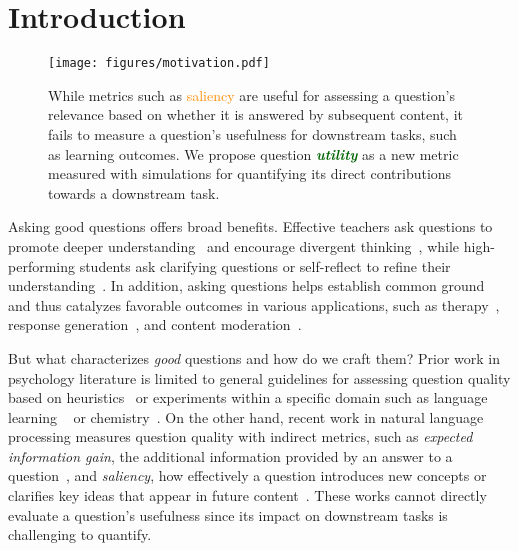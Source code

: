 \section{Introduction}


\begin{figure}[t!]
    \centering
    \begin{minipage}{\columnwidth}
    \centering
    \texttt{[image: figures/motivation.pdf]}
    \caption{
    While metrics such as \textcolor{darkorange}{saliency} are useful for assessing a question's relevance based on whether it is answered by subsequent content, it fails to measure a question's usefulness for downstream tasks, such as learning outcomes. 
    We propose question \textcolor{darkgreen}{\textbf{\textit{utility}}} as a new metric measured with simulations for quantifying its direct contributions towards a downstream task. 
    }
    \vspace{-0.3cm}
    \label{fig:motivation}
\end{minipage}
\vspace{-0.3cm}
\end{figure}


Asking good questions offers broad benefits.
Effective teachers ask questions to promote deeper understanding~\cite{bloom1956handbook, tofade2013best} and encourage divergent thinking~\cite{ciardiello1998did, graesser2010good, vale2013value}, while high-performing students ask clarifying questions or self-reflect to refine their  understanding~\cite{abbott1980teaching, davey1986effects, good1988learning, brassell2008comprehension, van2003questioning, davoudi2015systematic}. 
In addition, asking questions helps establish common ground~\cite{rao-daume-iii-2018-learning, aliannejadi2019asking, yu-etal-2020-interactive, zamani2020generating, white-etal-2021-open} and thus catalyzes favorable outcomes in various applications, such as therapy~\cite{shaikh-etal-2024-grounding}, response generation~\cite{zhou-etal-2022-reflect, cho-etal-2024-speechworthy}, and content moderation~\cite{cho-etal-2024-language}.  


But what characterizes \textit{good} questions and how do we craft them?
Prior work in psychology literature is limited to general guidelines for assessing question quality based on heuristics~\cite{graesser2010good, vale2013value} or experiments within a specific domain such as language learning ~\cite{hofstein2005developing} or chemistry~\cite{davoudi2015systematic}. 
On the other hand, recent work in natural language processing measures question quality with indirect metrics, such as \textit{expected information gain}, the additional information provided by an answer to a question~\cite{lindley1956measure, rao-daume-iii-2018-learning, yu-etal-2020-interactive, white-etal-2021-open, keh-etal-2024-asking}, and \textit{saliency}, how effectively a question introduces new concepts or clarifies key ideas that appear in future content~\cite{wu2024questions}.
These works cannot directly evaluate a question's usefulness since its impact on downstream tasks is challenging to quantify.

